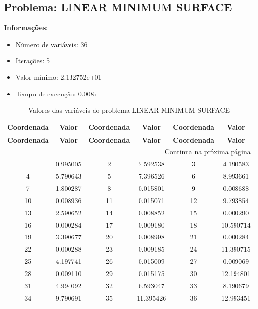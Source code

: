 \documentclass[12pt]{article}
\begin{document}
\newpage            
\subsection{Problema: LINEAR MINIMUM SURFACE}

\textbf{Informações:}
\begin{itemize}
\item Número de variáveis: 36
\item Iterações: 5
\item Valor mínimo: 2.132752e+01
\item Tempo de execução: 0.008s
\end{itemize}

\small
\begin{longtable}{@{}cc|cc|cc@{}}
\caption{Valores das variáveis do problema LINEAR MINIMUM SURFACE} \\
\toprule
\textbf{Coordenada} & \textbf{Valor} & \textbf{Coordenada} & \textbf{Valor} & \textbf{Coordenada} & \textbf{Valor} \\
\midrule
\endfirsthead

\toprule
\textbf{Coordenada} & \textbf{Valor} & \textbf{Coordenada} & \textbf{Valor} & \textbf{Coordenada} & \textbf{Valor} \\
\midrule
\endhead

\midrule \multicolumn{6}{r}{{Continua na próxima página}} \\ \midrule
\endfoot

\bottomrule
\endlastfoot
1 & 0.995005 & 2 & 2.592538 & 3 & 4.190583 \\
4 & 5.790643 & 5 & 7.396526 & 6 & 8.993661 \\
7 & 1.800287 & 8 & 0.015801 & 9 & 0.008688 \\
10 & 0.008936 & 11 & 0.015071 & 12 & 9.793854 \\
13 & 2.590652 & 14 & 0.008852 & 15 & 0.000290 \\
16 & 0.000284 & 17 & 0.009180 & 18 & 10.590714 \\
19 & 3.390677 & 20 & 0.008998 & 21 & 0.000284 \\
22 & 0.000288 & 23 & 0.009185 & 24 & 11.390715 \\
25 & 4.197741 & 26 & 0.015009 & 27 & 0.009069 \\
28 & 0.009110 & 29 & 0.015175 & 30 & 12.194801 \\
31 & 4.994092 & 32 & 6.593047 & 33 & 8.190679 \\
34 & 9.790691 & 35 & 11.395426 & 36 & 12.993451 \\

\end{longtable}
\end{document}
